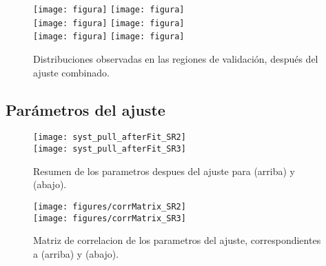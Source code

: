 \begin{figure}[!htbp]
  \centering

  \texttt{[image: figura]}
  \texttt{[image: figura]} \\

  \texttt{[image: figura]}
  \texttt{[image: figura]} \\

  \texttt{[image: figura]}
  \texttt{[image: figura]} \\

  \caption{Distribuciones observadas en las regiones de validación,  después del ajuste combinado.}
  \label{fig:bkgfit_CRh_after}

\end{figure}

\clearpage


\subsection{Parámetros del ajuste}

\begin{figure}[!htbp]
  \centering

  \texttt{[image: syst\_pull\_afterFit\_SR2]} \\
  \texttt{[image: syst\_pull\_afterFit\_SR3]}

  \caption{Resumen de los parametros despues del ajuste para {\SRL} (arriba) y {\SRH} (abajo).}
  \label{fig:fit_unc_nuisance_SR}

\end{figure}

\begin{figure}[!htbp]
  \centering

  \texttt{[image: figures/corrMatrix\_SR2]} \\
  \texttt{[image: figures/corrMatrix\_SR3]} \\

  \caption{Matriz de correlacion de los parametros del ajuste, correspondientes a {\SRL} (arriba) y {\SRH} (abajo).}
  \label{fig:fit_corr_SR}

\end{figure}



